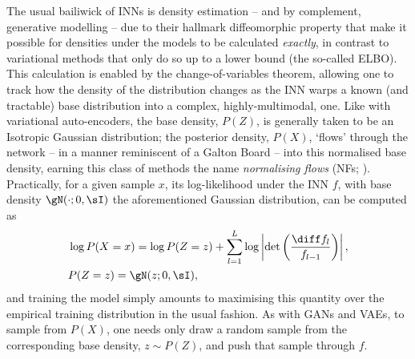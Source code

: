 The usual bailiwick of INNs is density estimation -- and by complement, generative modelling --
due to their hallmark diffeomorphic property that make it possible for densities under the models
to be calculated \emph{exactly}, in contrast to variational methods that only do so up to a lower
bound (the so-called ELBO). 
%
%
This calculation is enabled by the change-of-variables theorem, allowing one to track how the
density of the distribution changes as the INN warps a known (and tractable) base distribution into
a complex, highly-multimodal, one.
%
Like with variational auto-encoders, the base density, \(P(Z)\), is generally taken to be an
Isotropic Gaussian distribution; the posterior density, \(P(X)\), `flows' through the network -- in
a manner reminiscent of a Galton Board -- into this normalised base density, earning this class of
methods the name \emph{normalising flows} (NFs; \cite{rezende2015variational,
kobyzev2020normalizing}).
%
Practically, for a given sample \(x\), its log-likelihood under the INN \(f\), with base density
\(\gN(\cdot; 0, \sI)\) the aforementioned Gaussian distribution, can be computed as
%
\begin{equation*}
%
    \begin{aligned}
        &\log P(X=x) = 
        \log P(Z=z) + \sum_{l=1}^L \log \left| \det\left( \frac{\diff f_l}{ f_{l-1}}\right)
        \right|, \\
        &P(Z=z) = \gN(z; 0, \sI),
    \end{aligned}
\label{eq:cov}
%
\end{equation*}
%
and training the model simply amounts to maximising this quantity over the empirical training
distribution in the usual fashion.
%
As with GANs and VAEs, to sample from \(P(X)\), one needs only draw a random sample from the
corresponding base density, \(z \sim P(Z) \), and push that sample through \(f\).


